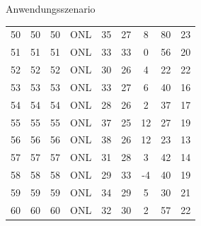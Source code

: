 \documentclass[
  8pt,
  ignorenonframetext,
]{beamer}
\begin{document}
\begin{frame}[fragile]{Anwendungsszenario}
\begin{longtable}[]{@{}lcccccccc@{}}
50 & 50 & 50 & ONL & 35 & 27 & 8 & 80 & 23 \\
51 & 51 & 51 & ONL & 33 & 33 & 0 & 56 & 20 \\
52 & 52 & 52 & ONL & 30 & 26 & 4 & 22 & 22 \\
53 & 53 & 53 & ONL & 33 & 27 & 6 & 40 & 16 \\
54 & 54 & 54 & ONL & 28 & 26 & 2 & 37 & 17 \\
55 & 55 & 55 & ONL & 37 & 25 & 12 & 27 & 19 \\
56 & 56 & 56 & ONL & 38 & 26 & 12 & 23 & 13 \\
57 & 57 & 57 & ONL & 31 & 28 & 3 & 42 & 14 \\
58 & 58 & 58 & ONL & 29 & 33 & -4 & 40 & 19 \\
59 & 59 & 59 & ONL & 34 & 29 & 5 & 30 & 21 \\
60 & 60 & 60 & ONL & 32 & 30 & 2 & 57 & 22 \\
\bottomrule
\end{longtable}
\end{frame}
\end{document}

